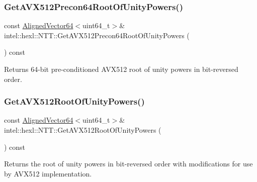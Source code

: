 \subsubsection{\texorpdfstring{Get\+A\+V\+X512\+Precon64\+Root\+Of\+Unity\+Powers()}{GetAVX512Precon64RootOfUnityPowers()}}
{\footnotesize\ttfamily const \hyperlink{namespaceintel_1_1hexl_afbdf0d2cc4209ee547a88ff22a02801b}{Aligned\+Vector64}$<$uint64\+\_\+t$>$\& intel\+::hexl\+::\+N\+T\+T\+::\+Get\+A\+V\+X512\+Precon64\+Root\+Of\+Unity\+Powers (\begin{DoxyParamCaption}{ }\end{DoxyParamCaption}) const\hspace{0.3cm}{\ttfamily [inline]}}



Returns 64-\/bit pre-\/conditioned A\+V\+X512 root of unity powers in bit-\/reversed order. 

\mbox{\label{classintel_1_1hexl_1_1NTT_ac93455767a667ef07aa41f747c77b4ae}} 
\subsubsection{\texorpdfstring{Get\+A\+V\+X512\+Root\+Of\+Unity\+Powers()}{GetAVX512RootOfUnityPowers()}}
{\footnotesize\ttfamily const \hyperlink{namespaceintel_1_1hexl_afbdf0d2cc4209ee547a88ff22a02801b}{Aligned\+Vector64}$<$uint64\+\_\+t$>$\& intel\+::hexl\+::\+N\+T\+T\+::\+Get\+A\+V\+X512\+Root\+Of\+Unity\+Powers (\begin{DoxyParamCaption}{ }\end{DoxyParamCaption}) const\hspace{0.3cm}{\ttfamily [inline]}}



Returns the root of unity powers in bit-\/reversed order with modifications for use by A\+V\+X512 implementation. 

\mbox{\label{classintel_1_1hexl_1_1NTT_a25172ec87ce3cbfe9bbc20cd9c52f2ab}} 

